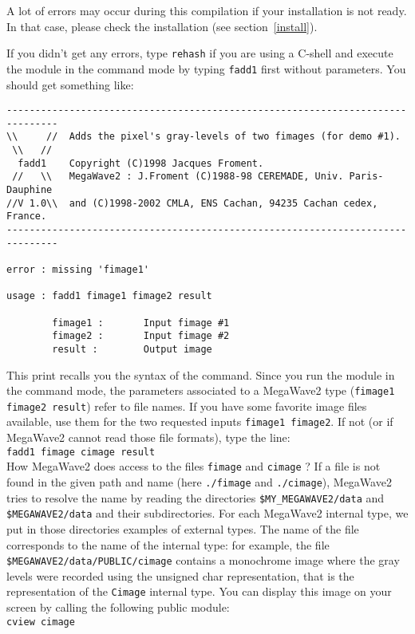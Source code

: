 A lot of errors may occur during this compilation if your installation is not ready.
In that case, please check the installation (see section~\ref{install}).

If you didn't get any errors, type \verb+rehash+ if you are using a C-shell and execute the module in
the command mode by typing \verb+fadd1+ first without parameters.
You should get something like:
{
\small
\begin{verbatim}
-------------------------------------------------------------------------------
\\     //  Adds the pixel's gray-levels of two fimages (for demo #1).
 \\   //   
  fadd1    Copyright (C)1998 Jacques Froment. 
 //   \\   MegaWave2 : J.Froment (C)1988-98 CEREMADE, Univ. Paris-Dauphine
//V 1.0\\  and (C)1998-2002 CMLA, ENS Cachan, 94235 Cachan cedex, France.
-------------------------------------------------------------------------------

error : missing 'fimage1'

usage : fadd1 fimage1 fimage2 result

        fimage1 :       Input fimage #1
        fimage2 :       Input fimage #2
        result :        Output image

\end{verbatim}
}
This print recalls you the syntax of the command.
Since you run the module in the command mode, the parameters associated to a MegaWave2 type (\verb+fimage1 fimage2 result+) refer to file names.
If you have some favorite image files available, use them for the two requested inputs
\verb+fimage1 fimage2+.
If not (or if MegaWave2 cannot read those file formats), type the line: \\
\verb+fadd1 fimage cimage result+\\
How MegaWave2 does access to the files \verb+fimage+ and \verb+cimage+ ?
If a file is not found in the given path and name (here \verb+./fimage+ and \verb+./cimage+), MegaWave2 tries to resolve the name by reading the directories \verb+$MY_MEGAWAVE2/data+
and \verb+$MEGAWAVE2/data+ and their subdirectories.
For each MegaWave2 internal type, we put in those directories examples of external types.
The name of the file corresponds to the name of the internal type: for example, the file \\
\verb+$MEGAWAVE2/data/PUBLIC/cimage+ contains a monochrome  image where the gray levels were recorded using the unsigned char representation, that is the representation of the \verb+Cimage+ internal type.
You can display this image on your screen by calling the following public module: \\
\verb+cview cimage+\\

